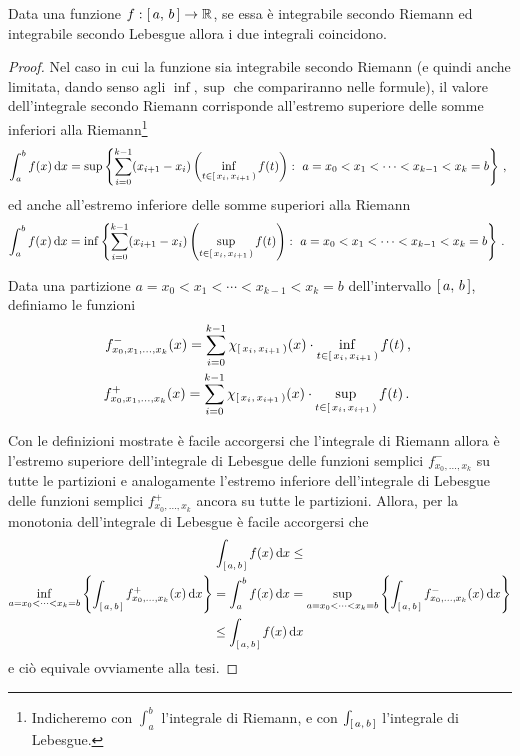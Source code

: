 \begin{proposition}\label{prop:IntegraleRiemannCoincide}
	Data una funzione $f:\left[\,a,\,b\,\right]\to \mathbb R$, se essa è integrabile secondo Riemann ed integrabile secondo Lebesgue allora i due integrali coincidono.
\end{proposition}
\begin{proof}
	Nel caso in cui la funzione sia integrabile secondo Riemann (e quindi anche limitata, dando senso agli $\inf,\sup$ che compariranno nelle formule), il valore dell'integrale secondo Riemann corrisponde all'estremo superiore delle somme inferiori alla Riemann\footnote{Indicheremo con $\int_a^b$ l'integrale di Riemann, e con $\int_{\left[\,a,\,b\,\right]}$ l'integrale di Lebesgue.}
	\begin{equation*}
		\int_a^b f(x)\de x=\sup\left\{\sum_{i=0}^{k-1} (x_{i+1}-x_i)\left(\inf_{t\in\co{x_i}{x_{i+1}}}f(t)\right):\ a=x_0<x_1<\cdots<x_{k-1}<x_k=b\right\} \virgola
	\end{equation*}
	ed anche all'estremo inferiore delle somme superiori alla Riemann
	\begin{equation*}
		\int_a^b f(x)\de x=\inf\left\{\sum_{i=0}^{k-1} (x_{i+1}-x_i)\left(\sup_{t\in\co{x_i}{x_{i+1}}}f(t)\right):\ a=x_0<x_1<\cdots<x_{k-1}<x_k=b\right\} \punto
	\end{equation*}
	
	Data una partizione $a=x_0<x_1<\cdots<x_{k-1}<x_k=b$ dell'intervallo $\left[\,a,\,b\,\right]$, definiamo le funzioni
	\begin{align*}
		f^-_{x_0,x_1,\dots,x_k}(x)=\sum_{i=0}^{k-1}\chi_{\left[\,x_i,\,x_{i+1}\,\right)}(x)\cdot\inf_{t\in\left[\,x_i,\,x_{i+1}\,\right)}f(t) \, \text{, } \\
		f^+_{x_0,x_1,\dots,x_k}(x)=\sum_{i=0}^{k-1}\chi_{\left[\,x_i,\,x_{i+1}\,\right)}(x)\cdot\sup_{t\in\left[\,x_i,\,x_{i+1}\,\right)}f(t) \, \text{. }
	\end{align*}

	Con le definizioni mostrate è facile accorgersi che l'integrale di Riemann allora è l'estremo superiore dell'integrale di Lebesgue delle funzioni semplici $f^-_{x_0,\dots,x_k}$ su tutte le partizioni e analogamente l'estremo inferiore dell'integrale di Lebesgue delle funzioni semplici $f^+_{x_0,\dots,x_k}$ ancora su tutte le partizioni.
	Allora, per la monotonia dell'integrale di Lebesgue è facile accorgersi che
	\begin{multline*}
		\int_{\left[\,a,\,b\,\right]}f(x)\,\mathrm d x\le \\
		\inf_{a=x_0<\dots<x_k=b}\left\{\int_{\left[\,a,\,b\,\right]}f^+_{x_0,\dots,x_k}(x)\,\mathrm d x\right\}
		=\int_a^b f(x)\,\mathrm d x= 
		\sup_{a=x_0<\dots<x_k=b}\left\{\int_{\left[\,a,\,b\,\right]}f^-_{x_0,\dots,x_k}(x)\,\mathrm d x\right\}\\
		 \le \int_{\left[\,a,\,b\,\right]} f(x)\,\mathrm d x
	\end{multline*}
	e ciò equivale ovviamente alla tesi.
\end{proof}

